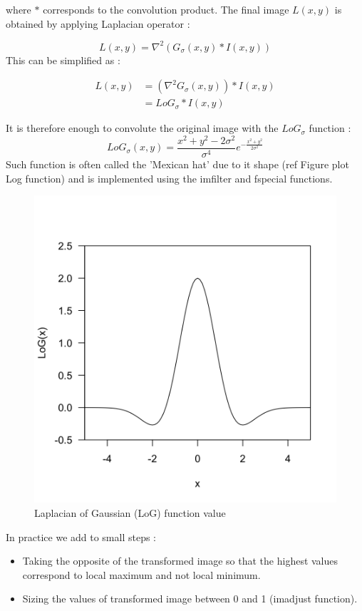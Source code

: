 \documentclass[12pt]{article}
\begin{document}
where $*$ corresponds to the convolution product.
The final image $L(x,y)$ is obtained by applying Laplacian operator :

\begin{equation}
L(x,y) = \nabla^2(G_{\sigma}(x,y)*I(x,y))
\end{equation}
This can be simplified as :

\begin{align}
L(x,y) & = (\nabla^2G_{\sigma}(x,y))*I(x,y) \\
& = LoG_{\sigma}*I(x,y)  \nonumber
\end{align}

It is therefore enough to convolute the original image with the $LoG_{\sigma}$ function :
\begin{equation}
LoG_{\sigma}(x,y) =  \frac{x^2+y^2-2\sigma^2}{\sigma^4}e^{-\frac{x^2+y^2}{2\sigma^2}}
\end{equation}
Such function is often called the 'Mexican hat' due to it shape (ref Figure plot Log function) and is implemented using the imfilter and fspecial functions.

\begin{figure}[!h]
	\begin{center}
		\includegraphics[width=0.5\linewidth]{LoG_function.png}
		\caption{Laplacian of Gaussian (LoG) function value}
		\label{Fig:Log}
	\end{center}
\end{figure}

In practice we add to small steps :
\begin{itemize}
\item Taking the opposite of the transformed image so that the highest values correspond to local maximum and not local minimum.
\item Sizing the values of transformed image between 0 and 1 (imadjust function).
\end{itemize}
\end{document}
